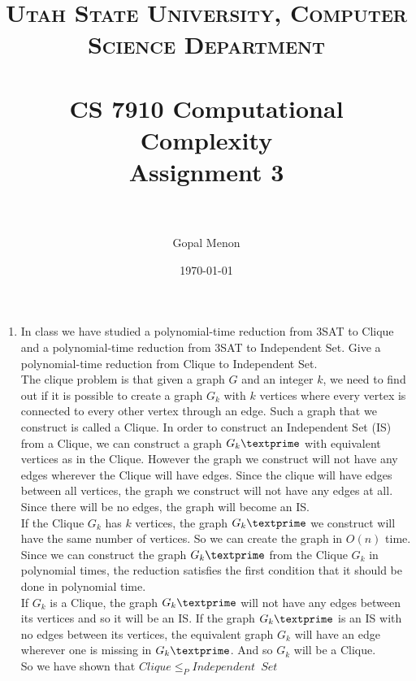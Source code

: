 \documentclass[paper=a4, fontsize=11pt]{scrartcl} %
\title{	
\normalfont \normalsize 
\textsc{Utah State University, Computer Science Department} \\ [25pt] %
\horrule{0.5pt} \\[0.4cm] %
\huge CS 7910 Computational Complexity\\Assignment 3 \\ %
\horrule{2pt} \\[0.5cm] %
}
\author{Gopal Menon} %
\date{\normalsize\today} %
\numberwithin{equation}{section} %
\numberwithin{figure}{section} %
\numberwithin{table}{section} %
\begin{document}
\maketitle %

\begin{enumerate}
\item In class we have studied a polynomial-time reduction from 3SAT to Clique and a polynomial-time reduction from 3SAT to Independent Set. Give a polynomial-time reduction from Clique to Independent Set.\\

The clique problem is that given a graph $G$ and an integer $k$, we need to find out if it is possible to create a graph $G_k$ with $k$ vertices where every vertex is connected to every other vertex through an edge. Such a graph that we construct is called a Clique. In order to construct an Independent Set (IS) from a Clique, we can construct a graph $G_k\textprime$ with equivalent vertices as in the Clique. However the graph we construct will not have any edges wherever the Clique will have edges. Since the clique will have edges between all vertices, the graph we construct will not have any edges at all. Since there will be no edges, the graph will become an IS.\\

If the Clique $G_k$ has $k$ vertices, the graph $G_k\textprime$ we construct will have the same number of vertices. So we can create the graph in $O(n)$ time. Since we can construct the graph $G_k\textprime$ from the Clique $G_k$ in polynomial times, the reduction satisfies the first condition that it should be done in polynomial time.\\

If $G_k$ is a Clique, the graph $G_k\textprime$ will not have any edges between its vertices and so it will be an IS. If the graph $G_k\textprime$ is an IS with no edges between its vertices, the equivalent graph $G_k$ will have an edge wherever one is missing in $G_k\textprime$. And so $G_k$ will be a Clique.\\

So we have shown that $Clique \leq_P Independent \enspace Set$


\end{enumerate}
\end{document}
